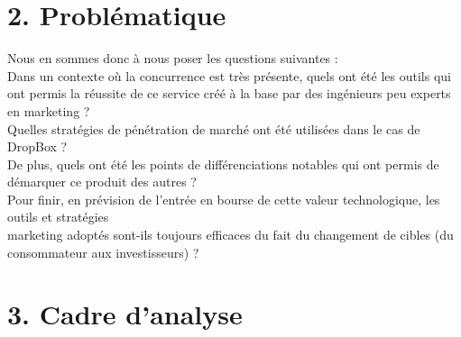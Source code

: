 \documentclass[a4paper, 10pt]{article}
\begin{document}
\section*{2. Probl\'ematique}
\indent

Nous en sommes donc à nous poser les questions suivantes :\\
Dans un contexte où la concurrence est très présente, quels ont été les outils qui ont permis la réussite de ce service
créé à la base par des ingénieurs peu experts en marketing ?\\
Quelles stratégies de pénétration de marché ont été utilisées dans le cas de DropBox ?\\
De plus, quels ont été les points de différenciations notables qui ont permis de démarquer ce produit des autres ?\\
Pour finir, en prévision de l'entrée en bourse de cette valeur technologique,
les outils et stratégies\\marketing adoptés sont-ils toujours efficaces du fait du changement de cibles
(du consommateur aux investisseurs) ?
\newpage

\section*{3. Cadre d'analyse}
\indent
\end{document}
